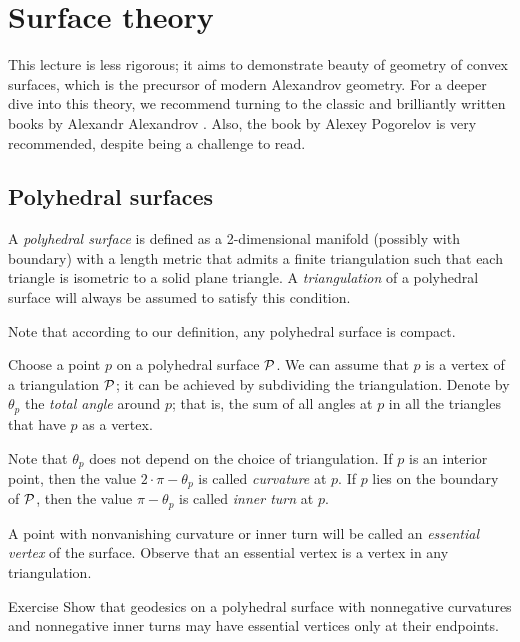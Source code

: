 \chapter{Surface theory}\label{chap:surfaces}

This lecture is less rigorous;
it aims to demonstrate beauty of geometry of convex surfaces, which is the precursor of modern Alexandrov geometry.
For a deeper dive into this theory, we recommend turning to the classic and brilliantly written books by Alexandr Alexandrov \cite{alexandrov,alexandrov-1948}.
Also, the book by Alexey Pogorelov \cite{pogorelov1969} is very recommended, despite being a challenge to read.


\section{Polyhedral surfaces}

A \emph{polyhedral surface} is defined as a 2-dimensional manifold (possibly with boundary) with a length metric that admits a finite triangulation such that each triangle is isometric to a solid plane triangle.
A \emph{triangulation} of a polyhedral surface will always be assumed to satisfy this condition.

Note that according to our definition, any polyhedral surface is compact.

Choose a point $p$ on a polyhedral surface $\mathcal{P}$.
We can assume that $p$ is a vertex of a triangulation $\mathcal{P}$;
it can be achieved by subdividing the triangulation.
Denote by $\theta_p$ the \emph{total angle} around $p$;
that is, the sum of all angles at $p$ in all the triangles that have $p$ as a vertex.

Note that $\theta_p$ does not depend on the choice of triangulation.
If $p$ is an interior point, then the value $2\cdot\pi-\theta_p$ is called \emph{curvature} at $p$.
If $p$ lies on the boundary of $\mathcal{P}$, then the value $\pi-\theta_p$ is called \emph{inner turn} at $p$.

A point with nonvanishing curvature or inner turn will be called an \emph{essential vertex} of the surface.
Observe that an essential vertex is a vertex in any triangulation.

\begin{thm}{Exercise}\label{ex:geodesic-vertex}
Show that geodesics on a polyhedral surface with nonnegative curvatures and nonnegative inner turns may have essential vertices only at their endpoints.
\end{thm}

